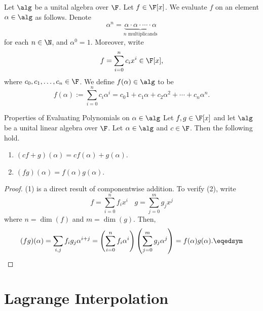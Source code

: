 \documentclass[math_245.tex]{subfiles}
\begin{document}
    \begin{remark}
        Let $\alg$ be a unital algebra over $\F$. Let $f\in \F[x]$. We evaluate $f$ on an element $\alpha\in \alg$ as follows. Denote
        \begin{equation*}
            \alpha^n = \underbrace{\alpha\cdot\alpha\cdot\cdots\cdot\alpha}_{n\text{ multiplicands}}
        \end{equation*}
        for each $n\in \N$, and $\alpha^0 = 1$. Moreover, write
        \begin{equation*}
            f = \sum^n_{i=0} c_ix^i\in \F[x],
        \end{equation*}
        where $c_0, c_1, \ldots, c_n\in\F$. We define $f(\alpha)\in\alg$ to be
        \begin{equation*}
            f(\alpha) := \sum^n_{i=0} c_i\alpha^i = c_0 1 + c_1\alpha + c_2\alpha^2 + \cdots + c_n\alpha^n.
        \end{equation*}
    \end{remark}

    \begin{prop}{Properties of Evaluating Polynomials on $\alpha\in\alg$}
        Let $f,g\in \F[x]$ and let $\alg$ be a unital linear algebra over $\F$. Let $\alpha\in \alg$ and $c\in\F$. Then the following hold.
        \begin{enumerate}
            \item $(cf+g)(\alpha) = cf(\alpha)+g(\alpha)$.
            \item $(fg)(\alpha) = f(\alpha)g(\alpha)$.
        \end{enumerate}
    \end{prop}

    \begin{proof}
        (1) is a direct result of componentwise addition. To verify (2), write
        \begin{equation*}
            f = \sum^n_{i=0} f_ix^i \ \ \ \ g = \sum^m_{j=0} g_jx^j
        \end{equation*}
        where $n = \dim(f)$ and $m = \dim(g)$. Then,
        \begin{equation*}
            (fg)(\alpha) = \sum_{i,j} f_ig_j\alpha^{i+j} = \left( \sum^n_{i=0} f_i\alpha^i \right)\left( \sum^m_{j=0} g_j\alpha^j \right) = f(\alpha)g(\alpha). \eqedsym
        \end{equation*}
    \end{proof}

    \section{Lagrange Interpolation}
\end{document}
